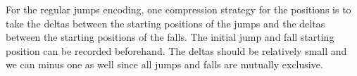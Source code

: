 

For the regular jumps encoding, one compression strategy for the positions is to
take the deltas between the starting positions of the jumps and the deltas
between the starting positions of the falls. The initial jump and fall starting
position can be recorded beforehand. The deltas should be relatively small and
we can minus one as well since all jumps and falls are mutually exclusive.


